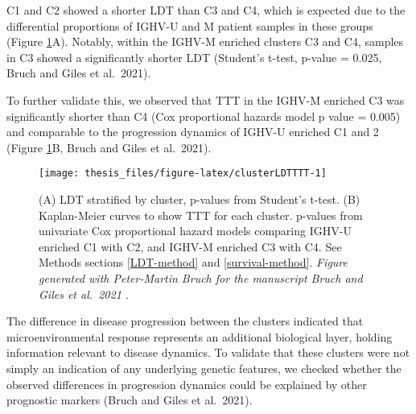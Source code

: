 \documentclass[11pt, a4paper, twosided]{book}
\begin{document}
C1 and C2 showed a shorter LDT than C3 and C4, which is expected due to the differential proportions of IGHV-U and M patient samples in these groups (Figure \ref{fig:clusterLDTTTT}A). Notably, within the IGHV-M enriched clusters C3 and C4, samples in C3 showed a significantly shorter LDT (Student's t-test, p-value = 0.025, Bruch and Giles et al.~2021).

To further validate this, we observed that TTT in the IGHV-M enriched C3 was significantly shorter than C4 (Cox proportional hazards model p value = 0.005) and comparable to the progression dynamics of IGHV-U enriched C1 and 2 (Figure \ref{fig:clusterLDTTTT}B, Bruch and Giles et al.~2021).


\begin{figure}

{\centering \texttt{[image: thesis\_files/figure-latex/clusterLDTTTT-1]} 

}

\caption{(A) LDT stratified by cluster, p-values from Student's t-test. (B) Kaplan-Meier curves to show TTT for each cluster. p-values from univariate Cox proportional hazard models comparing IGHV-U enriched C1 with C2, and IGHV-M enriched C3 with C4. See Methods sections \ref{LDT-method} and \ref{survival-method}. \emph{Figure generated with Peter-Martin Bruch for the manuscript Bruch and Giles et al.~2021 .}}\label{fig:clusterLDTTTT}
\end{figure}
The difference in disease progression between the clusters indicated that microenvironmental response represents an additional biological layer, holding information relevant to disease dynamics. To validate that these clusters were not simply an indication of any underlying genetic features, we checked whether the observed differences in progression dynamics could be explained by other prognostic markers (Bruch and Giles et al.~2021).
\end{document}
